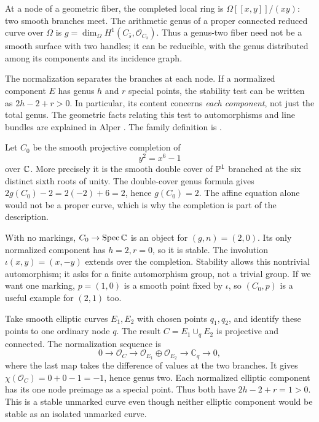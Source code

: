 At a node of a geometric fiber, the completed local ring is
$\Omega[[x,y]]/(xy)$: two smooth branches meet. The arithmetic genus
of a proper connected reduced curve over $\Omega$ is
$g=\dim_\Omega H^1(C_{\bar s},\mathcal O_{C_{\bar s}})$.
Thus a genus-two fiber need not be a smooth surface with two handles;
it can be reducible, with the genus distributed among its components
and its incidence graph.

The normalization separates the branches at each node. If a normalized
component $E$ has genus $h$ and $r$ special points, the stability test
can be written as $2h-2+r>0$. In particular, its content concerns
\emph{each component}, not just the total genus. The geometric facts
relating this test to automorphisms and line bundles are explained in
Alper \cite[Definition 6.3.2, Proposition 6.3.5, pp.~225--226]{Alper}.
The family definition is \cite[Definition 6.3.20, p.~231]{Alper}.

\begin{Ex}\label{ex:genus-two}
Let $C_0$ be the smooth projective completion of
\[
                            y^2=x^6-1
\]
over $\mathbb C$. More precisely it is the smooth double cover of $\mathbb P^1$
branched at the six distinct sixth roots of unity. The double-cover
genus formula gives $2g(C_0)-2=2(-2)+6=2$, hence $g(C_0)=2$.
The affine equation alone would not be a proper curve, which is why
the completion is part of the description.

With no markings, $C_0\to\operatorname{Spec}\mathbb C$ is an object for $(g,n)=(2,0)$.
Its only normalized component has $h=2,r=0$, so it is stable.
The involution $\iota(x,y)=(x,-y)$ extends over the completion.
Stability allows this nontrivial automorphism; it asks for a finite
automorphism group, not a trivial group. If we want one marking,
$p=(1,0)$ is a smooth point fixed by $\iota$, so
$(C_0,p)$ is a useful example for $(2,1)$ too.
\end{Ex}

\begin{Ex}\label{ex:genus-two-nodal}
Take smooth elliptic curves $E_1,E_2$ with chosen points $q_1,q_2$,
and identify these points to one ordinary node $q$. The result
$C=E_1\cup_q E_2$ is projective and connected. The normalization
sequence is
\[
0\longrightarrow\mathcal O_C\longrightarrow
\mathcal O_{E_1}\oplus\mathcal O_{E_2}
\longrightarrow\mathbb C_q\longrightarrow0,
\]
where the last map takes the difference of values at the two branches.
It gives $\chi(\mathcal O_C)=0+0-1=-1$, hence genus two.
Each normalized elliptic component has its one node preimage as a
special point. Thus both have $2h-2+r=1>0$. This is a stable
unmarked curve even though neither elliptic component would be
stable as an isolated unmarked curve.
\end{Ex}

